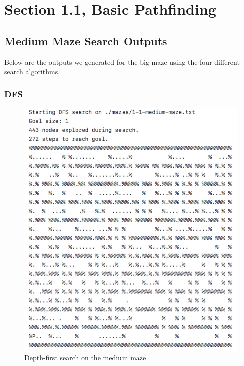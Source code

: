 \documentclass[titlepage]{article}
\begin{document}

\newpage

\section*{Section 1.1, Basic Pathfinding} 


\subsection*{Medium Maze Search Outputs}
Below are the outputs we generated for the big maze using the four different search algorithms. 

\subsubsection*{DFS}
\begin{figure}[h!]
\includegraphics[width=\linewidth]{dfsmedium.png}
\caption{Depth-first search on the medium maze}
\label{fig:DFSmedium}
\end{figure}

\newpage
\end{document}
